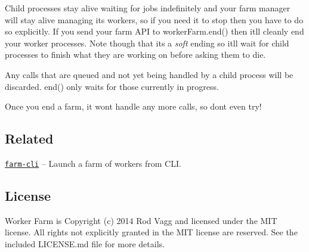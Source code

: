 Child processes stay alive waiting for jobs indefinitely and your farm manager will stay alive managing its workers, so if you need it to stop then you have to do so explicitly. If you send your farm A\+PI to {\ttfamily worker\+Farm.\+end()} then it\textquotesingle{}ll cleanly end your worker processes. Note though that it\textquotesingle{}s a {\itshape soft} ending so it\textquotesingle{}ll wait for child processes to finish what they are working on before asking them to die.

Any calls that are queued and not yet being handled by a child process will be discarded. {\ttfamily end()} only waits for those currently in progress.

Once you end a farm, it won\textquotesingle{}t handle any more calls, so don\textquotesingle{}t even try!

\subsection*{Related}


\begin{DoxyItemize}
\item \href{https://github.com/Kikobeats/farm-cli}{\tt farm-\/cli} – Launch a farm of workers from C\+LI.
\end{DoxyItemize}

\subsection*{License}

Worker Farm is Copyright (c) 2014 Rod Vagg \href{https://twitter.com/rvagg}{\tt } and licensed under the M\+IT license. All rights not explicitly granted in the M\+IT license are reserved. See the included L\+I\+C\+E\+N\+S\+E.\+md file for more details. 